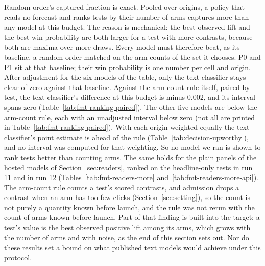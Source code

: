 Random order's captured fraction is exact. Pooled over origins, a policy that reads no forecast and ranks tests by their number of arms captures more than any model at this budget. The reason is mechanical: the best observed lift and the best win probability are both larger for a test with more contrasts, because both are maxima over more draws. Every model must therefore beat, as its baseline, a random order matched on the arm counts of the set it chooses. P0 and P1 sit at that baseline; their win probability is one number per cell and origin. After adjustment for the six models of the table, only the text classifier stays clear of zero against that baseline.
Against the arm-count rule itself, paired by test, the text classifier's difference at this budget is minus 0.002, and its interval spans zero (Table~\ref{tab:fmt-ranking-paired}). The other five models are below the arm-count rule, each with an unadjusted interval below zero (not all are printed in Table~\ref{tab:fmt-ranking-paired}). With each origin weighted equally the text classifier's point estimate is ahead of the rule (Table~\ref{tab:decision-upworthy}), and no interval was computed for that weighting. So no model we ran is shown to rank tests better than counting arms. The same holds for the plain panels of the hosted models of Section~\ref{sec:readers}, ranked on the headline-only tests in run 11 and in run 12 (Tables~\ref{tab:fmt-readers-more} and~\ref{tab:fmt-readers-more-api}). The arm-count rule counts a test's scored contrasts, and admission drops a contrast when an arm has too few clicks (Section~\ref{sec:setting}), so the count is not purely a quantity known before launch, and the rule was not rerun with the count of arms known before launch. Part of that finding is built into the target: a test's value is the best observed positive lift among its arms, which grows with the number of arms and with noise, as the end of this section sets out. Nor do these results set a bound on what published text models would achieve under this protocol.

